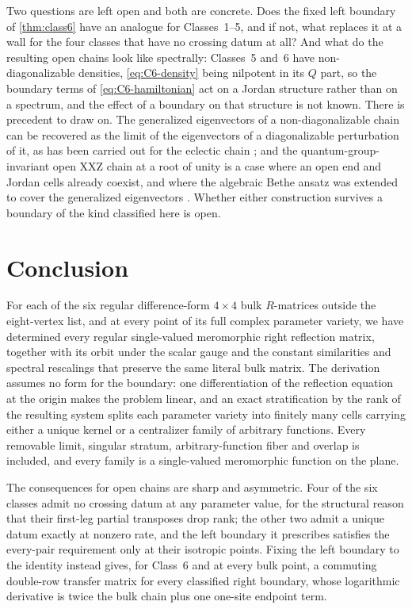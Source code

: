 \documentclass[11pt,reqno]{amsart}
\theoremstyle{plain}
\theoremstyle{definition}
\theoremstyle{remark}
\numberwithin{equation}{section}
\begin{document}
Two questions are left open and both are concrete. Does the fixed left boundary
of \cref{thm:class6} have an analogue for Classes~1--5, and if not, what replaces
it at a wall for the four classes that have no crossing datum at all? And what do
the resulting open chains look like spectrally: Classes~5 and~6 have
non-diagonalizable densities, \cref{eq:C6-density} being nilpotent in its $Q$
part, so the boundary terms of \cref{eq:C6-hamiltonian} act on a Jordan structure
rather than on a spectrum, and the effect of a boundary on that structure is not
known. There is precedent to draw on. The generalized eigenvectors of a
non-diagonalizable chain can be recovered as the limit of the eigenvectors of a
diagonalizable perturbation of it, as has been carried out for the eclectic
chain \cite{NietoGarcia_2022jb}; and the quantum-group-invariant open XXZ chain
at a root of unity is a case where an open end and Jordan cells already coexist,
and where the algebraic Bethe ansatz was extended to cover the generalized
eigenvectors \cite{Gainutdinov_2016ab}. Whether either construction survives a
boundary of the kind classified here is open.

\section{Conclusion}
\label{sec:conclusion}

For each of the six regular difference-form $4\times4$ bulk $R$-matrices outside
the eight-vertex list, and at every point of its full complex parameter variety,
we have determined every regular single-valued meromorphic right reflection
matrix, together with its orbit under the scalar gauge and the constant
similarities and spectral rescalings that preserve the same literal bulk matrix.
The derivation assumes no form for the boundary: one differentiation of the
reflection equation at the origin makes the problem linear, and an exact
stratification by the rank of the resulting system splits each parameter variety
into finitely many cells carrying either a unique kernel or a centralizer family
of arbitrary functions. Every removable limit, singular stratum,
arbitrary-function fiber and overlap is included, and every family is a
single-valued meromorphic function on the plane.

The consequences for open chains are sharp and asymmetric. Four of the six
classes admit no crossing datum at any parameter value, for the structural reason
that their first-leg partial transposes drop rank; the other two admit a unique
datum exactly at nonzero rate, and the left boundary it prescribes satisfies the
every-pair requirement only at their isotropic points. Fixing the left boundary to
the identity instead gives, for Class~6 and at every bulk point, a commuting
double-row transfer matrix for every classified right boundary, whose logarithmic
derivative is twice the bulk chain plus one one-site endpoint term.
\end{document}
